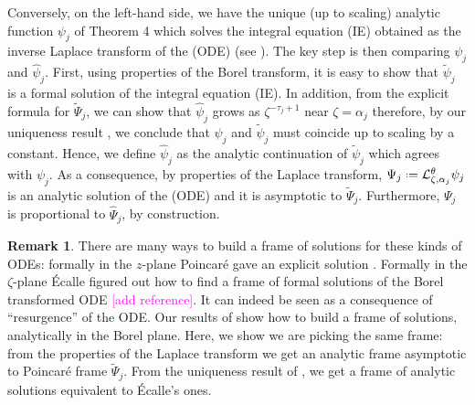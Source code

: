 \documentclass{article}
\theoremstyle{definition}
\newcommand{\series}[1]{\tilde{#1}}
\newcommand*{\defeq}{\mathrel{\vcenter{\baselineskip0.5ex \lineskiplimit0pt
                     \hbox{\scriptsize.}\hbox{\scriptsize.}}}%
                     =}
\newcommand{\laplace}{\mathcal{L}}
\newcommand{\borel}{\mathcal{B}}
\newtheorem{remark}[definition]{Remark}
\theoremstyle{plain}
\begin{document}
\begin{center}
\end{center} 

Conversely, on the left-hand side, we have the unique (up to scaling) analytic function $\psi_j$ of Theorem 4 \cite{reg-sing-volterra} which solves the integral equation (IE) obtained as the inverse Laplace transform of the (ODE) (see \cite[Lemma 2]{reg-sing-volterra}). The key step is then comparing $\psi_j$ and $\hat{\psi}_j$. First, using properties of the Borel transform, it is easy to show that $\series{\psi}_j$ is a formal solution of the integral equation (IE). In addition, from the explicit formula for $\tilde{\Psi}_j$, we can show that $\hat{\psi}_j$ grows as $\zeta^{-\tau_j+1}$ near $\zeta=\alpha_j$
therefore, by our uniqueness result \cite[Theorem 4]{reg-sing-volterra}, we conclude that $\psi_j$ and $\tilde{\psi}_j$ must coincide up to scaling by a constant. Hence, we define $\hat{\psi}_j$ as the analytic continuation of $\tilde{\psi}_j$ which agrees with $\psi_j$. As a consequence, by properties of the Laplace transform, $\Psi_j\defeq\laplace_{\zeta,\alpha_j}^{\theta}\psi_j$ is an analytic solution of the (ODE) and it is asymptotic to $\series{\Psi}_j$. Furthermore, $\Psi_j$ is proportional to $\hat{\Psi}_j$, by construction.   

\begin{remark}
There are many ways to build a frame of solutions for these kinds of ODEs: formally in the $z$-plane Poincar\'e gave an explicit solution \cite{int-irreg}. Formally in the $\zeta$-plane \'Ecalle figured out how to find a frame of formal solutions of the Borel transformed ODE \textcolor{magenta}{[add reference]\cite{EcalleIII,loday-Remy2011}}. It can indeed be seen as a consequence of ``resurgence'' of the ODE. Our results of \cite{reg-sing-volterra} show how to build a frame of solutions, analytically in the Borel plane. Here, we show we are picking the same frame: from the properties of the Laplace transform we get an analytic frame asymptotic to Poincar\'e frame $\series{\Psi}_j$. From the uniqueness result of \cite[Theorem~4]{reg-sing-volterra}, we get a frame of analytic solutions equivalent to \'Ecalle's ones. 
\end{remark} 
\end{document}
